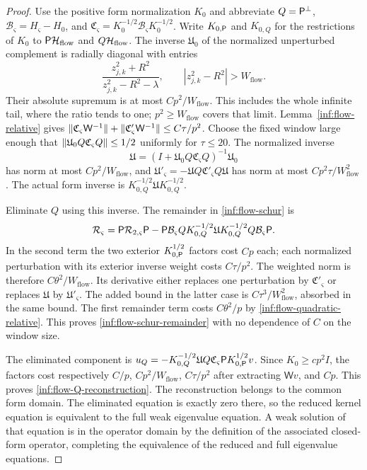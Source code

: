 \begin{proof}
Use the positive form normalization $K_0$ and abbreviate
$Q=\mathsf P^\perp$, $\mathcal B_\varsigma=H_\varsigma-H_0$, and
$\mathfrak C_\varsigma=K_0^{-1/2}\mathcal B_{\varsigma}K_0^{-1/2}$.
Write $K_{0,\mathsf P}$ and $K_{0,Q}$ for the restrictions of $K_0$
to $\mathsf P\mathcal{H}_{\mathrm{flow}}$ and $Q\mathcal{H}_{\mathrm{flow}}$.
The inverse $\mathfrak U_0$ of the normalized unperturbed complement is
radially diagonal with entries
\[
 \frac{z_{j,k}^2+R^2}{z_{j,k}^2-R^2-\lambda},
 \qquad |z_{j,k}^2-R^2|>W_{\mathrm{flow}}.
\]
Their absolute supremum is at most $Cp^2/W_{\mathrm{flow}}$.
This includes the whole infinite tail, where the ratio tends to
one; $p^2\ge W_{\mathrm{flow}}$ covers that limit.
Lemma~\ref{inf:flow-relative} gives
$\lVert \mathfrak C_\varsigma\mathsf W^{-1}\rVert+
\lVert \mathfrak C'_\varsigma\mathsf W^{-1}\rVert\le C\tau/p^2$.
Choose the fixed window large enough that
$\lVert \mathfrak U_0Q\mathfrak C_{\varsigma}Q\rVert\le1/2$ uniformly for $\tau\le20$.
The normalized inverse
\[
 \mathfrak U=(I+\mathfrak U_0Q\mathfrak C_{\varsigma}Q)^{-1}\mathfrak U_0
\]
has norm at most $Cp^2/W_{\mathrm{flow}}$, and
$\mathfrak U'_\varsigma=-\mathfrak UQ\mathfrak C'_{\varsigma}Q\mathfrak U$ has norm at most
$Cp^2\tau/W_{\mathrm{flow}}^2$.
The actual form inverse is $K_{0,Q}^{-1/2}\mathfrak UK_{0,Q}^{-1/2}$.

Eliminate $Q$ using this inverse. The remainder in
\eqref{inf:flow-schur} is
\[
 \mathcal R_\varsigma=\mathsf P\mathcal R_{2,\varsigma}\mathsf P
 -\mathsf P\mathcal B_{\varsigma}QK_{0,Q}^{-1/2}\mathfrak UK_{0,Q}^{-1/2}
                                      Q\mathcal B_\varsigma\mathsf P.
\]
In the second term the two exterior $K_{0,\mathsf P}^{1/2}$ factors cost
$Cp$ each; each normalized perturbation with its exterior inverse
weight costs $C\tau/p^2$. The weighted norm is therefore
$C\theta^2/W_{\mathrm{flow}}$.
Its derivative either replaces one perturbation by $\mathfrak C'_\varsigma$ or replaces
$\mathfrak U$ by $\mathfrak U'_\varsigma$. The added bound in the latter case is
$C\tau^3/W_{\mathrm{flow}}^2$, absorbed in the same bound.
The first remainder term costs $C\theta^2/p$ by
\eqref{inf:flow-quadratic-relative}. This proves
\eqref{inf:flow-schur-remainder} with no dependence of $C$ on the
window size.

The eliminated component is
$u_Q=-K_{0,Q}^{-1/2}\mathfrak UQ\mathfrak C_\varsigma\mathsf P K_{0,\mathsf P}^{1/2}v$.
Since $K_0\ge cp^2I$, the factors cost respectively
$C/p$, $Cp^2/W_{\mathrm{flow}}$, $C\tau/p^2$ after extracting
$\mathsf Wv$, and $Cp$. This proves
\eqref{inf:flow-Q-reconstruction}. The reconstruction belongs to
the common form domain. The eliminated equation is exactly zero
there, so the reduced kernel equation is equivalent to the full
weak eigenvalue equation. A weak solution of that equation is in
the operator domain by the definition of the associated closed-form
operator, completing the equivalence of the reduced and full
eigenvalue equations.
\end{proof}

